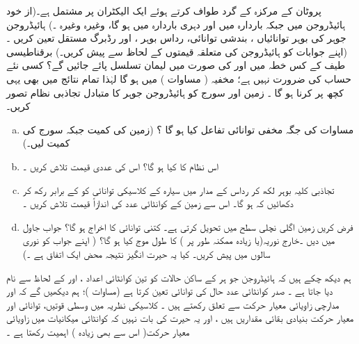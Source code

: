    پروٹان  کے مرکزہ کے گرد طواف کرتے ہوئے  ایک  الیکٹران  پر مشتمل  ہے۔(از  خود ہائیڈروجن  میں      جبکہ    باردارہ  میں   اور دہری باردارہ    میں    ہو گا،  وغیرہ وغیرہ ۔)   ہائیڈروجن  جوہر کی بوہر  توانائیاں  ،  بندشی  توانائی،   رداس بوہر  ،  اور رڈبرگ  مستقل  
 تعین کریں ۔ (اپنے جوابات کو  ہائیڈروجن  کی متعلقہ قیمتوں کے لحاظ سے پیش کریں۔)   برقناطیسی طیف کے کس خطہ میں   اور   کی صورت میں   لیمان   تسلسل پائے جائیں گے؟    کسی نئے   حساب کی ضرورت نہیں ہے؛   مخفیہ (  مساوات )   میں    ہو گا لہٰذا تمام  نتائج میں بھی یہی کچھ پر کرنا  ہو  گا  ۔
زمین اور سورج کو ہائیڈروجن  جوہر کا متبادل تجاذبی نظام تصور کریں۔
\begin{enumerate}[a.]
\item
 مساوات    کی جگہ مخفی توانائی تفاعل کیا  ہو گا ؟  (زمین کی کمیت   جبکہ سورج کی کمیت  لیں۔)
\item
اس نظام کا       کیا ہو گا؟ اس کی عددی قیمت تلاش کریں ۔
\item
تجاذبی کلیہ  بوہر  لکھ کر  رداس   کے مدار میں سیارہ  کے کلاسیکی توانائی کو   کے برابر رکھ کر  دکھائیں کہ  ہو گا۔ اس سے زمین کے کوانٹائی  عدد  کی اندازاً قیمت تلاش کریں ۔ 
\item
فرض کریں  زمین  اگلی نچلی سطح    میں تحویل کرتی  ہے۔  کتنی توانائی  کا اخراج ہو گا؟  جواب   جاول   میں دیں ۔خارج   نوریہ(یا   زیادہ ممکنہ طور پر )   کا طول موج کیا ہو گا؟ ( اپنے جواب کو نوری سالوں میں پیش کریں۔ کیا یہ حیرت انگیز  نتیجہ محض ایک اتفاق ہے ۔)
\end{enumerate}

ہم دیکھ چکے ہیں کہ ہائیڈروجن جو ہر کے ساکن حالات کو تین کوانٹائی اعداد ،   اور  کے لحاظ سے نام دیا جاتا ہے ۔ صدر کوانٹائی عدد   حال کی توانائی تعین کرتا ہے  (مساوات  )؛  ہم دیکھیں گے کہ  اور  مدارچی زاویائی معیار حرکت سے تعلق رکھتے ہیں ۔ کلاسیکی نظریہ میں وسطی قوتیں،  توانائی اور معیار حرکت بنیادی بقائی مقداریں ہیں ،  اور یہ حیرت کی  بات نہیں  کہ کوانٹائی میکانیات میں  زاویائی معیار حرکت( اس سے بھی زیادہ ) اہمیت  رکھتا ہے ۔

